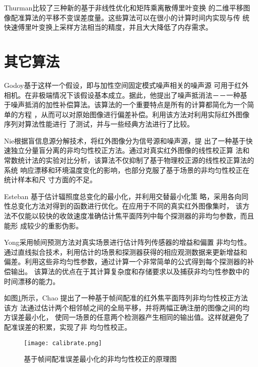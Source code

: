 \documentclass[../main]{subfiles}
\begin{document}
Thurman\cite{ThurmanEfficient}比较了三种新的基于非线性优化和矩阵乘离散傅里叶变换
的二维平移图像配准算法的平移不变误差度量。这些算法可以在很小的计算时间内实现与传
统快速傅里叶变换上采样方法相当的精度，并且大大降低了内存需求。

\section{其它算法}%
\label{sec:其它算法}

Godoy\cite{Godoy2008Noise}基于这样一个假设，即与加性空间固定模式噪声相关的噪声源
可用于红外相机。在非极端情况下该假设基本成立。据此，他提出了噪声抵消法－－一种基
于噪声抵消的加性补偿算法。该算法的一个重要特点是所有的计算都简化为一个简单的方程
，从而可以对原始图像进行偏差补偿。利用该方法对利用实际红外图像序列对算法性能进行
了测试，并与一些经典方法进行了比较。

Nie\cite{Nie2010Infrared}根据盲信息源分解技术，将红外图像分为信号源和噪声源，提
出了一种基于快速独立分量盲分离的非均匀性校正方法。通过对真实红外图像的线性校正算
法和常数统计法的实验对比分析，该算法不仅抑制了基于物理校正源的线性校正算法的系统
响应漂移和环境温度变化的影响，也部分克服了基于场景的非均匀性校正在统计样本和尺
寸方面的不足。

Esteban\cite{Esteban2011Total} 基于估计辐照度总变化的最小化，并利用交替最小化策
略，采用各向同性总变化方法对得到的函数进行优化。在应用于不同的真实红外图像集时，
该方法不仅能以较快的收敛速度准确估计焦平面阵列中每个探测器的非均匀参数，而且能形
成较少的重影伪影。

Yong\cite{Yong2009Scene}采用帧间预测方法对真实场景进行估计阵列传感器的增益和偏置
非均匀性。通过直线拟合技术，利用估计的场景和探测器获得的相应观测数据来更新增益和
偏差。利用这些非均匀性参数，通过计算一个非常简单的公式得到每个探测器的补偿输出。
该算法的优点在于其计算复杂度和存储要求以及捕获非均匀性参数中的时间漂移的能力。

如图\ref{fig:基于帧间配准误差最小化的非均匀性校正的原理图}所示，Chao
\cite{Chao2011Scene} 提出了一种基于帧间配准的红外焦平面阵列非均匀性校正方法该方
法通过估计两个相邻帧之间的全局平移，并将两幅正确注册的图像之间的均方误差最小化，
使同一场景的任意两个检测器产生相同的输出值。这样就避免了配准误差的积累，实现了非
均匀性校正。

\begin{figure}[htbp]
\centering
\texttt{[image: calibrate.png]}
\caption{基于帧间配准误差最小化的非均匀性校正的原理图}
\label{fig:基于帧间配准误差最小化的非均匀性校正的原理图}
\end{figure}
\end{document}
